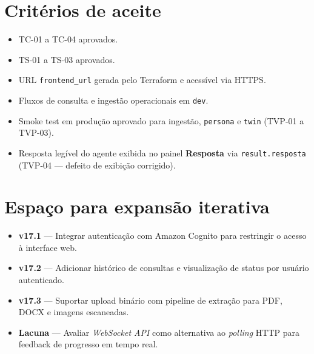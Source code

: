 \section{Crit\'erios de aceite}

\begin{itemize}[leftmargin=*]
  \item TC-01 a TC-04 aprovados.
  \item TS-01 a TS-03 aprovados.
  \item URL \texttt{frontend\_url} gerada pelo Terraform e acess\'ivel via HTTPS.
  \item Fluxos de consulta e ingest\~ao operacionais em \texttt{dev}.
  \item Smoke test em produ\c{c}\~ao aprovado para ingest\~ao,
        \texttt{persona} e \texttt{twin} (TVP-01 a TVP-03).
  \item Resposta leg\'ivel do agente exibida no painel \textbf{Resposta}
        via \texttt{result.resposta} (TVP-04 --- defei\-to de exibi\c{c}\~ao corrigido).
\end{itemize}

\section{Espa\c{c}o para expans\~ao iterativa}

\begin{itemize}[leftmargin=*]
  \item \textbf{v17.1} --- Integrar autentica\c{c}\~ao com Amazon Cognito
         para restringir o acesso \`a interface web.
  \item \textbf{v17.2} --- Adicionar hist\'orico de consultas e visualiza\c{c}\~ao
        de status por usu\'ario autenticado.
  \item \textbf{v17.3} --- Suportar upload bin\'ario com pipeline de extra\c{c}\~ao
        para PDF, DOCX e imagens escaneadas.
  \item \textbf{Lacuna} --- Avaliar \textit{WebSocket API} como alternativa
        ao \textit{polling} HTTP para feedback de progresso em tempo real.
\end{itemize}
